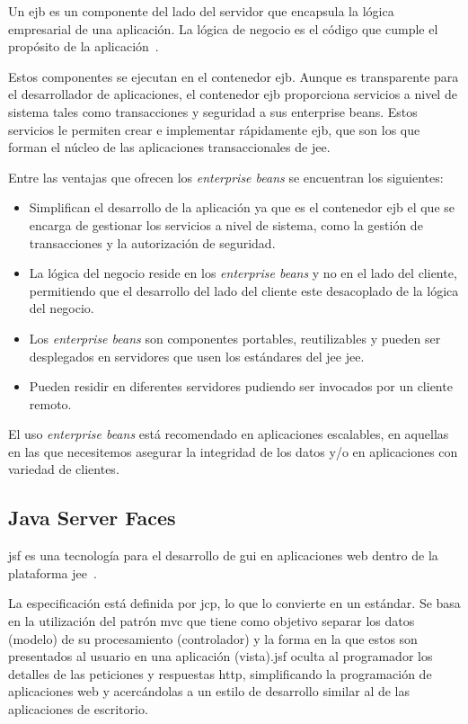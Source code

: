 Un \acrfull{ejb} es un componente del lado del servidor que encapsula la lógica empresarial de una aplicación. La lógica de negocio es el código que cumple el propósito de la aplicación~\cite{JEE7-Tutorial}.

Estos componentes se ejecutan en el contenedor \acrshort{ejb}. Aunque es transparente para el desarrollador de aplicaciones, el contenedor \acrshort{ejb} proporciona servicios a nivel de sistema tales como transacciones y seguridad a sus enterprise beans. Estos servicios le permiten crear e implementar rápidamente \acrshort{ejb}, que son los que forman el núcleo de las aplicaciones transaccionales de \acrshort{jee}.

Entre las ventajas que ofrecen los \textit{enterprise beans} se encuentran los siguientes:
\begin{itemize}
\item Simplifican el desarrollo de la aplicación ya que es el contenedor \acrshort{ejb} el que se encarga de gestionar los servicios a nivel de sistema, como la gestión de transacciones y la autorización de seguridad.
\item La lógica del negocio reside en los \textit{enterprise beans} y no en el lado del cliente, permitiendo que el desarrollo del lado del cliente este desacoplado de la lógica del negocio.
\item Los \textit{enterprise beans} son componentes portables, reutilizables y pueden ser desplegados en servidores que usen los estándares del  \acrshort{jee} \acrshort{jee}.
\item Pueden residir en diferentes servidores pudiendo ser invocados por un cliente remoto.
\end{itemize}

El uso \textit{enterprise beans} está recomendado en aplicaciones escalables, en aquellas en las que necesitemos asegurar la integridad de los datos y/o en aplicaciones con variedad de clientes.


\subsection{Java Server Faces}
\label{sec:jsf}
\acrfull{jsf} es una tecnología para el desarrollo de \acrshort{gui} en aplicaciones web dentro de la plataforma \acrshort{jee}~\cite{DesarrolloJakartaEE}.

La especificación está definida por \acrfull{jcp}, lo que lo convierte en un estándar. Se basa en la utilización del patrón  \acrfull{mvc} que tiene como objetivo separar los datos (modelo) de su procesamiento (controlador) y la forma en la que estos son presentados al usuario en una aplicación (vista).\acrshort{jsf} oculta al programador los detalles de las peticiones y respuestas \acrshort{http}, simplificando la programación de aplicaciones web y acercándolas a un estilo de desarrollo similar al de las aplicaciones de escritorio.

